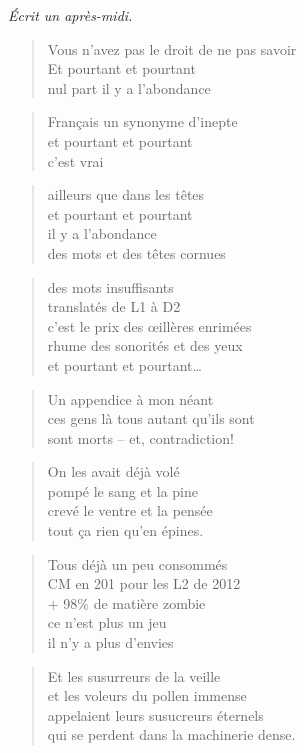   \begin{center}
    \textit{Écrit un après-midi.}
  \end{center}
  \begin{verse}
    Vous n’avez pas le droit de ne pas savoir\\
    Et pourtant et pourtant\\
    nul part il y a l’abondance
  \end{verse}
  \begin{verse}
    Français un synonyme d’inepte\\
    et pourtant et pourtant\\
    c’est vrai
  \end{verse}
  \begin{verse}
    ailleurs que dans les têtes\\
    et pourtant et pourtant\\
    il y a l’abondance\\
    des mots et des têtes cornues
  \end{verse}
  \begin{verse}
    des mots insuffisants\\
    translatés de L1 à D2\\
    c’est le prix des œillères enrimées\\
    rhume des sonorités et des yeux\\
    et pourtant et pourtant…
  \end{verse}

  \begin{verse}
    Un appendice à mon néant\\
    ces gens là tous autant qu’ils sont\\
    sont morts -- et, contradiction!
  \end{verse}
  \begin{verse}
    On les avait déjà volé\\
    pompé le sang et la pine\\
    crevé le ventre et la pensée\\
    tout ça rien qu’en épines.
  \end{verse}
  \begin{verse}
    Tous déjà un peu consommés\\
    CM en 201 pour les L2 de 2012\\
    + 98\% de matière zombie\\
    ce n’est plus un jeu\\
    il n’y a plus d’envies
  \end{verse}
  \begin{verse}
    Et les susurreurs de la veille\\
    et les voleurs du pollen immense\\
    appelaient leurs susucreurs éternels\\
    qui se perdent dans la machinerie dense.
  \end{verse}

